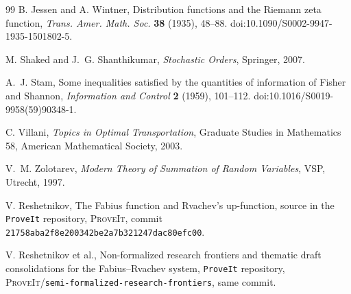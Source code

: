\documentclass[11pt,oneside]{article}
\numberwithin{equation}{section}
\theoremstyle{definition}
\theoremstyle{remark}
\newcommand{\repo}{\textsc{ProveIt}}
\begin{document}
\begin{thebibliography}{99}
B. Jessen and A. Wintner,
\newblock Distribution functions and the Riemann zeta function,
\newblock \emph{Trans. Amer. Math. Soc.} \textbf{38} (1935), 48--88.
\newblock doi:10.1090/S0002-9947-1935-1501802-5.

M. Shaked and J.~G. Shanthikumar,
\newblock \emph{Stochastic Orders},
\newblock Springer, 2007.

A.~J. Stam,
\newblock Some inequalities satisfied by the quantities of information of Fisher and Shannon,
\newblock \emph{Information and Control} \textbf{2} (1959), 101--112.
\newblock doi:10.1016/S0019-9958(59)90348-1.

C. Villani,
\newblock \emph{Topics in Optimal Transportation},
\newblock Graduate Studies in Mathematics 58, American Mathematical Society, 2003.

V.~M. Zolotarev,
\newblock \emph{Modern Theory of Summation of Random Variables},
\newblock VSP, Utrecht, 1997.

V. Reshetnikov,
\newblock The Fabius function and Rvachev's up-function,
\newblock source in the \texttt{ProveIt} repository, \repo{}, commit \texttt{21758aba2f8e200342be2a7b321247dac80efc00}.

V. Reshetnikov et al.,
\newblock Non-formalized research frontiers and thematic draft consolidations for the Fabius--Rvachev system,
\newblock \texttt{ProveIt} repository, \repo{}/\texttt{semi-formalized-research-frontiers}, same commit.

\end{thebibliography}
\end{document}
